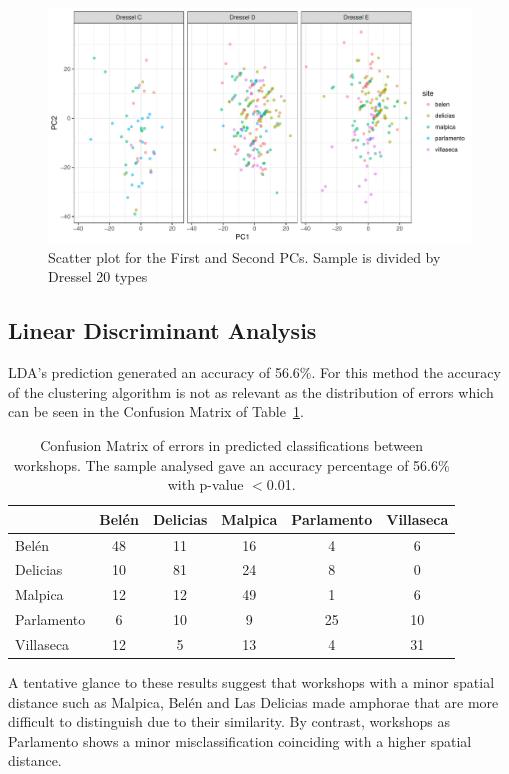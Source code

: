 \documentclass[review]{elsarticle}
\begin{document}
\begin{figure}[htp]
	\centering
\includegraphics[width=\linewidth]{figs/dresseltypes}
\caption{Scatter plot for the First and Second PCs. Sample is divided by Dressel 20 types}
\label{dressel}
\end{figure} 


\subsection{Linear Discriminant Analysis}

LDA's prediction generated an accuracy of 56.6\%. For this method the accuracy of the clustering algorithm is not as relevant as the distribution of errors which can be seen in the Confusion Matrix of Table~\ref{table:confusion}.

\begin{table}[htp]
\begin{tabular}{lccccc}
\hline
      & Belén & Delicias & Malpica & Parlamento & Villaseca\\ \hline
Belén & 48 & 11 & 16 & 4 & 6 \\
Delicias & 10 & 81 & 24 & 8 & 0 \\
Malpica & 12 & 12 & 49 & 1 & 6 \\
Parlamento & 6 & 10 & 9 & 25 & 10 \\
Villaseca & 12 & 5 & 13 & 4 & 31 \\
\hline

\end{tabular}
\caption{Confusion Matrix of errors in predicted classifications between workshops. The sample analysed gave an accuracy percentage of 56.6\% with p-value $<$0.01. }
\label{table:confusion}
\end{table}

A tentative glance to these results suggest that workshops with a minor spatial distance such as Malpica, Belén and Las Delicias made amphorae that are more difficult to distinguish due to their similarity. By contrast, workshops as Parlamento shows a minor misclassification coinciding with a higher spatial distance. 
\end{document}
